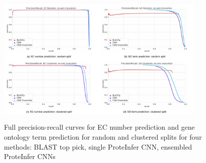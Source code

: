 \begin{figure}[ht] 
  \DIFdelbeginFL %
{%
} 
{%
} 
{%
} 
{%
} 
\DIFdelendFL \DIFaddbeginFL \includegraphics[width=0.9\textwidth]{combined_subfigs_c.pdf}
  \DIFaddendFL \caption{Full precision-recall curves for EC number prediction and gene ontology term prediction for random and clustered splits for four methods: BLAST top pick, single ProteInfer CNN, ensembled ProteInfer CNNs }
  \label{fig:without_ensemble} 
\end{figure}


